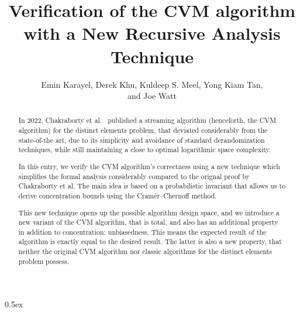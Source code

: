 \documentclass[11pt,a4paper]{article}
\theoremstyle{definition}
\begin{document}
\title{Verification of the CVM algorithm with a New Recursive Analysis Technique}
\author{Emin Karayel, Derek Khu, Kuldeep S. Meel, Yong Kiam Tan,\\and Joe Watt}
\maketitle

\begin{abstract}
In 2022, Chakraborty et al.~\cite{chakraborty2022} published a streaming
algorithm (henceforth, the CVM algorithm) for the distinct
elements problem, that deviated considerably from the state-of-the art, due to its simplicity
and avoidance of standard derandomization techniques, while still maintaining a close to optimal
logarithmic space complexity.

In this entry, we verify the CVM algorithm's correctness using a new technique which simplifies
the formal analysis considerably compared to the orignal proof by Chakraborty et
al. The main idea is based on a probabilistic invariant that allows us to derive concentration bounds
using the Cram\'{e}r--Chernoff method.

This new technique opens up the possible algorithm design space, and we introduce a new variant of the
CVM algorithm, that is total, and also has an additional property in addition
to concentration: unbiasedness. This means the expected result of the algorithm is exactly equal to
the desired result. The latter is also a new property, that neither the original CVM algorithm
nor classic algorithms for the distinct elements problem possess.
\end{abstract}

\tableofcontents

\parindent 0pt\parskip 0.5ex






\appendix

\end{document}
